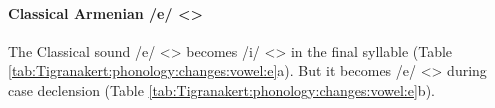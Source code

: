 \begin{table}[H]
	\centering 
	\caption{Change from Classical Armenian /u/ <> to /u/ <> in the Tigranakert dialect}
	\label{tab:Tigranakert:phonology:changes:vowel:u}
\end{table}



\paragraph{Classical Armenian /e/ <>}
The Classical sound /e/ <> becomes /i/ <> in the final syllable (Table \ref{tab:Tigranakert:phonology:changes:vowel:e}a). But it becomes /e/ <> during case declension (Table \ref{tab:Tigranakert:phonology:changes:vowel:e}b).





